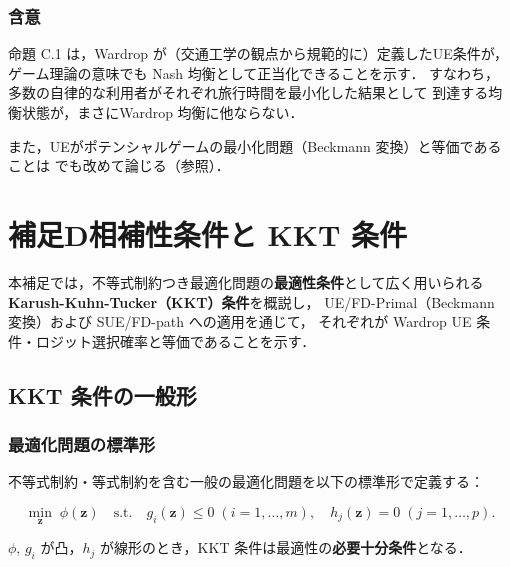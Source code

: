\subsubsection*{含意}

命題 C.1 は，Wardrop が（交通工学の観点から規範的に）定義したUE条件が，
ゲーム理論の意味でも Nash 均衡として正当化できることを示す．
すなわち，多数の自律的な利用者がそれぞれ旅行時間を最小化した結果として
到達する均衡状態が，まさにWardrop 均衡に他ならない．

また，UEがポテンシャルゲームの最小化問題（Beckmann 変換）と等価であることは
でも改めて論じる（参照）．

\section{補足D\quad 相補性条件と KKT 条件}
\label{sec:appendix-D}

本補足では，不等式制約つき最適化問題の\textbf{最適性条件}として広く用いられる
\textbf{Karush-Kuhn-Tucker（KKT）条件}を概説し，
UE/FD-Primal（Beckmann 変換）および SUE/FD-path への適用を通じて，
それぞれが Wardrop UE 条件・ロジット選択確率と等価であることを示す．

\subsection{KKT 条件の一般形}
\label{subsec:appendix-D-kkt}

\subsubsection*{最適化問題の標準形}

不等式制約・等式制約を含む一般の最適化問題を以下の標準形で定義する：

\begin{equation}
  \min_{\boldsymbol{z}} \; \phi(\boldsymbol{z})
  \quad \text{s.t.} \quad
  g_i(\boldsymbol{z}) \leq 0 \;(i=1,\ldots,m),
  \quad
  h_j(\boldsymbol{z}) = 0 \;(j=1,\ldots,p).
  \label{eq:appendix-D-general}
\end{equation}

$\phi,\, g_i$ が凸，$h_j$ が線形のとき，KKT 条件は最適性の\textbf{必要十分条件}となる．

